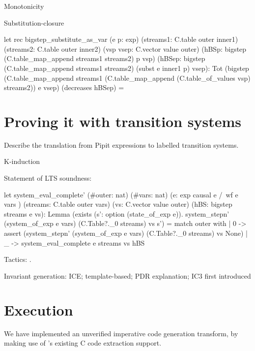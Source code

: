 \documentclass[sigplan,screen]{acmart}
\begin{document}
Monotonicity

Substitution-closure
\begin{code}
let rec bigstep_substitute_as_var (e p: exp)
  (streams1: C.table outer inner1)
  (streams2: C.table outer inner2)
  (vsp vsep: C.vector value outer)
  (hBSp: bigstep (C.table_map_append streams1 streams2) p vsp)
  (hBSep: bigstep (C.table_map_append streams1 streams2) (subst e inner1 p) vsep):
    Tot (bigstep (C.table_map_append streams1 (C.table_map_append (C.table_of_values vsp) streams2)) e vsep) (decreases hBSep) =

\end{code}



\section{Proving it with transition systems}

Describe the translation from Pipit expressions to labelled transition systems.

K-induction

Statement of LTS soundness:
\begin{code}
let system_eval_complete'
    (#outer: nat) (#vars: nat)
    (e: exp { causal e /\ wf e vars })
    (streams: C.table outer vars)
    (vs: C.vector value outer)
    (hBS: bigstep streams e vs):
      Lemma (exists (s': option (state_of_exp e)).
        system_stepn'
          (system_of_exp e vars)
          (C.Table?._0 streams) vs s') =
    match outer with
    | 0 -> assert
      (system_stepn'
        (system_of_exp e vars)
        (C.Table?._0 streams) vs None)
    | _ -> system_eval_complete e streams vs hBS
\end{code}

Tactics: \cite{martinez2019meta}.

Invariant generation: ICE\cite{garg2014ice}; template-based\cite{kahsai2011instantiation}; PDR explanation\cite{een2011efficient}; IC3 first introduced\cite{bradley2011sat}

\section{Execution}

We have implemented an unverified imperative code generation transform, by making use of \fstar{}'s existing C code extraction support\cite{protzenko2017verified}.
\end{document}
